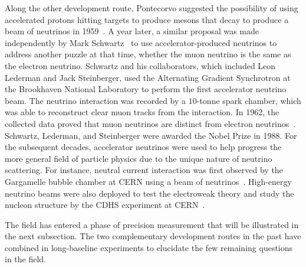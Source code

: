 Along the other development route, Pontecorvo suggested the possibility of using accelerated protons hitting targets to produce mesons that decay to produce a beam of neutrinos in 1959~\cite{Pontecorvo:1959sn}.
A year later, a similar proposal was made independently by Mark Schwartz~\cite{Schwartz:1960hg} to use accelerator-produced neutrinos to address another puzzle at that time, whether the muon neutrino is the same as the electron neutrino.
Schwartz and his collaborators, which included Leon Lederman and Jack Steinberger, used the Alternating Gradient Synchrotron at the Brookhaven National Laboratory to perform the first accelerator neutrino beam.
The neutrino interaction was recorded by a $10$-tonne spark chamber, which was able to reconstruct clear muon tracks from the interaction.
In 1962, the collected data proved that muon neutrinos are distinct from electron neutrinos~\cite{Danby:1962nd}.
Schwartz, Lederman, and Steinberger were awarded the Nobel Prize in 1988.
For the subsequent decades, accelerator neutrinos were used to help progress the more general field of particle physics due to the unique nature of neutrino scattering.
For instance, neutral current interaction was first observed by the Gargamelle bubble chamber at CERN using a beam of neutrinos~\cite{GargamelleNeutrino:1973jyy}.
High-energy neutrino beams were also deployed to test the electroweak theory and study the nucleon structure by the CDHS experiment at CERN~\cite{Schlatter:2015nxk}.

The field has entered a phase of precision measurement that will be illustrated in the next subsection.
The two complementary development routes in the past have combined in long-baseline experiments to elucidate the few remaining questions in the field.



